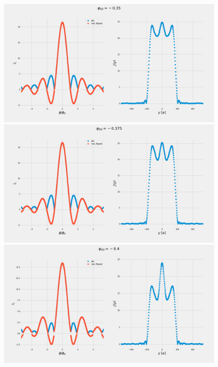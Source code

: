 \documentclass[a4paper]{article}
\begin{document}
\begin{figure}
\includegraphics[width=\textwidth]{figs/wg32double/current_and_density_035}
\includegraphics[width=\textwidth]{figs/wg32double/current_and_density_0375}
\includegraphics[width=\textwidth]{figs/wg32double/current_and_density_04}
\end{figure}
\end{document}
